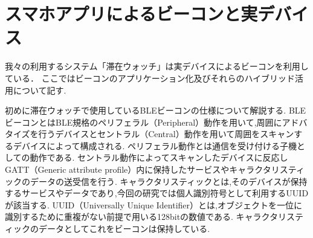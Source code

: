 \section{スマホアプリによるビーコンと実デバイス}\label{4.3}
我々の利用するシステム「滞在ウォッチ」は実デバイスによるビーコンを利用している．
ここではビーコンのアプリケーション化及びそれらのハイブリッド活用について記す.

初めに滞在ウォッチで使用しているBLEビーコンの仕様について解説する.
BLEビーコンとはBLE規格のペリフェラル（Peripheral）動作を用いて,周囲にアドバタイズを行うデバイスとセントラル（Central）動作を用いて周囲をスキャンするデバイスによって構成される.
ペリフェラル動作とは通信を受け付ける子機としての動作である.
セントラル動作によってスキャンしたデバイスに反応しGATT（Generic attribute profile）内に保持したサービスやキャラクタリスティックのデータの送受信を行う.
キャラクタリスティックとは,そのデバイスが保持するサービスやデータであり,今回の研究では個人識別符号として利用するUUIDが該当する.
UUID（Universally Unique Identifier）とは,オブジェクトを一位に識別するために重複がない前提で用いる128bitの数値である.
キャラクタリスティックのデータとしてこれをビーコンは保持している.










